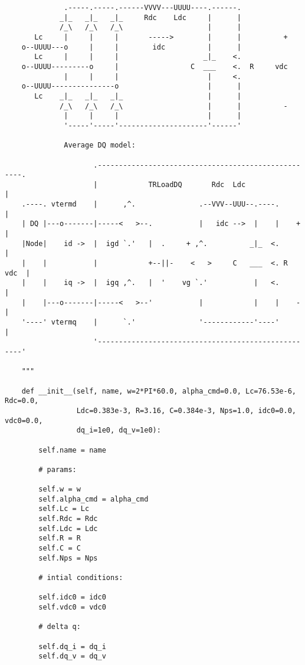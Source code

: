 \begin{lstlisting}
              .-----.-----.------VVVV---UUUU----.------.
             _|_   _|_   _|_     Rdc    Ldc     |      |
             /_\   /_\   /_\                    |      |
       Lc     |     |     |       ----->        |      |          +
    o--UUUU---o     |     |        idc          |      |
       Lc     |     |     |                    _|_    <.
    o--UUUU---------o     |                 C  ___    <.  R     vdc
              |     |     |                     |     <.
    o--UUUU---------------o                     |      |
       Lc    _|_   _|_   _|_                    |      |
             /_\   /_\   /_\                    |      |          -
              |     |     |                     |      |
              '-----'-----'---------------------'------'

              Average DQ model:

                     .----------------------------------------------------.
                     |            TRLoadDQ       Rdc  Ldc                 |
    .----. vtermd    |      ,^.               .--VVV--UUU--.----.         |
    | DQ |---o-------|-----<   >--.           |   idc -->  |    |    +    |
    |Node|    id ->  |  igd `.'   |  .     + ,^.          _|_  <.         |
    |    |           |            +--||-    <   >     C   ___  <. R  vdc  |
    |    |    iq ->  |  igq ,^.   |  '    vg `.'           |   <.         |
    |    |---o-------|-----<   >--'           |            |    |    -    |
    '----' vtermq    |      `.'               '------------'----'         |
                     '----------------------------------------------------'

    """

    def __init__(self, name, w=2*PI*60.0, alpha_cmd=0.0, Lc=76.53e-6, Rdc=0.0,
                 Ldc=0.383e-3, R=3.16, C=0.384e-3, Nps=1.0, idc0=0.0, vdc0=0.0,
                 dq_i=1e0, dq_v=1e0):

        self.name = name

        # params:

        self.w = w
        self.alpha_cmd = alpha_cmd
        self.Lc = Lc
        self.Rdc = Rdc
        self.Ldc = Ldc
        self.R = R
        self.C = C
        self.Nps = Nps

        # intial conditions:

        self.idc0 = idc0
        self.vdc0 = vdc0

        # delta q:

        self.dq_i = dq_i
        self.dq_v = dq_v


\end{lstlisting}
